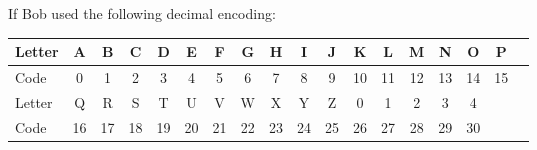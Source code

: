 \documentclass[12pt,emtex]{article}
\begin{document}
\begin{enumerate}
          \hspace{-10mm}   
             If Bob used the following decimal encoding:
          
          \hspace{-10mm}   
                \begin{tabular}{|l||c|c|c|c|c|c|c|c|c|c|c|c|c|c|c|c|c|} \hline
                  Letter  & \hspace{0.5mm}  A   \hspace{0.5mm} & \hspace{0.5mm} B \hspace{0.5mm} & \hspace{0.5mm} C \hspace{0.5mm}
                          & \hspace{0.5mm}  D   \hspace{0.5mm} & \hspace{0.5mm} E \hspace{0.5mm} & \hspace{0.5mm} F \hspace{0.5mm}
                          & \hspace{0.5mm}  G   \hspace{0.5mm} & \hspace{0.5mm} H \hspace{0.5mm} & \hspace{0.5mm} I \hspace{0.5mm}
                          & \hspace{0.5mm}  J   \hspace{0.5mm} & \hspace{0.5mm} K \hspace{0.5mm} & \hspace{0.5mm} L \hspace{0.5mm}
                          & \hspace{0.5mm}  M   \hspace{0.5mm} &  \hspace{0.5mm} N  \hspace{0.5mm}   &  \hspace{0.5mm}   O  \hspace{0.5mm} &  \hspace{0.5mm} P  \hspace{0.5mm} \\ \hline
                  Code  & 0   &   1   &   2   &   3   &   4   &   5   &   6   &   7   &   8   &   9   &   10  &   11  &   12 & 13  &   14 & 15  \\ \hline \hline
                  Letter     &   Q   &   R   &   S   &   T   &   U   &   V   &   W   &   X   &   Y   &   Z & 0 & 1& 2& 3 & 4 &  \\ \hline
                  Code    &   16  &   17  &   18  &   19  &   20  &   21  &   22  &   23  &   24  &   25 & 26 & 27 & 28 & 29 & 30 & \\ \hline
                \end{tabular}
    

\end{enumerate}
\end{document}
